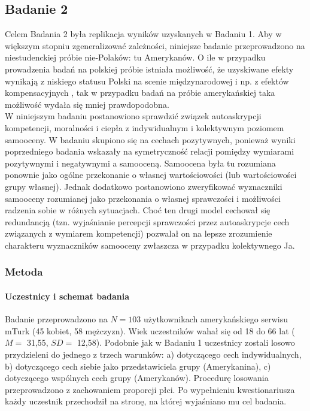 \documentclass[man]{apa6}
\begin{document}
\newpage
\subsection{Badanie 2}
Celem Badania 2 była replikacja wyników uzyskanych w Badaniu 1. Aby w większym stopniu zgeneralizować zależności, niniejsze badanie przeprowadzono na niestudenckiej próbie nie-Polaków: tu Amerykanów. O ile w przypadku prowadzenia badań na polskiej próbie istniała możliwość, że uzyskiwane efekty wynikają z niskiego statusu Polski na scenie międzynarodowej i np. z efektów kompensacyjnych \parencite[zob. np.][]{judd2005fundamental}, tak w przypadku badań na próbie amerykańskiej taka możliwość wydała się mniej prawdopodobna.\\
W niniejszym badaniu postanowiono sprawdzić związek autoaskrypcji kompetencji, moralności i ciepła z indywidualnym i kolektywnym poziomem samooceny. W badaniu skupiono się na cechach pozytywnych, ponieważ wyniki poprzedniego badania wskazały na symetryczność relacji pomiędzy wymiarami pozytywnymi i negatywnymi a samooceną. Samoocena była tu rozumiana ponownie jako ogólne przekonanie o własnej wartościowości (lub wartościowości grupy własnej). Jednak dodatkowo postanowiono zweryfikować wyznaczniki samooceny rozumianej jako przekonania o własnej sprawczości i możliwości radzenia sobie w różnych sytuacjach. Choć ten drugi model cechował się redundancją (tzn. wyjaśnianie percepcji sprawczości przez autoaskrypcje cech związanych z wymiarem kompetencji) pozwalał on na lepsze zrozumienie charakteru wyznaczników samooceny zwłaszcza w przypadku kolektywnego Ja.\\

\subsubsection{Metoda}

\paragraph{Uczestnicy i schemat badania}
Badanie przeprowadzono na $N=103$ użytkownikach amerykańskiego serwisu mTurk (45 kobiet, 58 mężczyzn). Wiek uczestników wahał się od 18 do 66 lat ($M=$ 31,55, $SD=$ 12,58). Podobnie jak w Badaniu 1 uczestnicy zostali losowo przydzieleni do jednego z trzech warunków: a) dotyczącego cech indywidualnych, b) dotyczącego cech siebie jako przedstawiciela grupy (Amerykanina), c) dotyczącego wspólnych cech grupy (Amerykanów). Procedurę losowania przeprowadzono z zachowaniem proporcji płci. Po wypełnieniu kwestionariusza każdy uczestnik przechodził na stronę, na której wyjaśniano mu cel badania.
\end{document}
